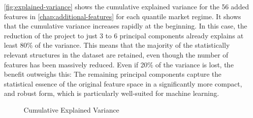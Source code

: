 \autoref{fig:explained-variance} shows the cumulative explained variance for the 56 added features in \autoref{chap:additional-features} for each quantile market regime. It shows that the cumulative variance increases rapidly at the beginning. In this case, the reduction of the project to just 3 to 6 principal components already explains at least 80\% of the variance. This means that the majority of the statistically relevant structures in the dataset are retained, even though the number of features has been massively reduced. Even if 20\% of the variance is lost, the benefit outweighs this: The remaining principal components capture the statistical essence of the original feature space in a significantly more compact, and robust form, which is particularly well-suited for machine learning.


\begin{figure}[H]
    \centering
    
    \caption{Cumulative Explained Variance}
    \label{fig:explained-variance}
\end{figure}
